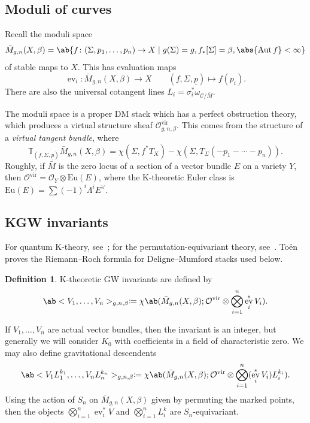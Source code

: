 \documentclass{amsart}
\theoremstyle{definition}
\newtheorem{defn}[thm]{Definition}
\theoremstyle{remark}
\theoremstyle{plain}
\theoremstyle{definition}
\theoremstyle{remark}
\newcommand{\mc}[1]{\mathcal{#1}}
\newcommand{\mr}[1]{\mathrm{#1}}
\newcommand{\ul}[1]{\underline{#1}}
\newcommand{\1}{\mathbf{1}}
\newcommand{\2}{\mathbf{2}}
\newcommand{\3}{\mathbf{3}}
\newcommand{\vir}{\mr{vir}}
\DeclareMathOperator{\Aut}{Aut}
\DeclareMathOperator{\ev}{ev}
\begin{document}
\subsection{Moduli of curves}%
\label{sub:Moduli of curves}

Recall the moduli space
\[ \bar{M}_{g,n}(X, \beta) = \ab\{ f \colon (\Sigma, p_1, \ldots, p_n) \to X \mid g(\Sigma) = g, f_*[\Sigma] = \beta, \abs{\Aut f} < \infty \} \]
of stable maps to \(X\). This has evaluation maps
\[ \ev_i \colon \bar{M}_{g,n}(X, \beta) \to X \qquad (f, \Sigma, \ul{p}) \mapsto f(p_i). \]
There are also the universal cotangent lines \(L_i = \sigma_i^* \omega_{ \mc{C}/\bar{M} }\).

The moduli space is a proper DM stack which has a perfect obstruction theory, which produces a virtual structure sheaf \(\mc{O}^{\vir}_{g,n,\beta}\). This comes from the structure of a \textit{virtual tangent bundle}, where
\[ \mathbb{T}_{(f, \Sigma, \ul{p})} \bar{M}_{g,n}(X, \beta) = \chi(\Sigma, f^* T_X) - \chi(\Sigma, T_{\Sigma}(-p_1 - \cdots - p_n)). \]
Roughly, if \(\bar{M}\) is the zero locus of a section of a vector bundle \(E\) on a variety \(Y\), then \(\mc{O}^{\vir} = \mc{O}_Y \otimes \mr{Eu}(E)\), where the K-theoretic Euler class is \(\mr{Eu}(E) = \sum (-1)^i \Lambda^i E^{\vee}\).

\subsection{KGW invariants}%
\label{sub:KGW invariants}

For quantum K-theory, see~\cite{Lee2004}; for the permutation-equivariant theory, see~\cite{Givental2017K1,GiventalK7}. To\"en~\cite{Toen1999} proves the Riemann--Roch formula for Deligne--Mumford stacks used below.

\begin{defn}
    K-theoretic GW invariants are defined by
    \[ \ab<V_1, \ldots, V_n>_{g,n,\beta} \coloneqq \chi\ab(\bar{M}_{g,n}(X, \beta); \mc{O}^{\vir} \otimes \bigotimes_{i=1}^n \ev_i^* V_i). \]
\end{defn}

If \(V_1, \ldots, V_n\) are actual vector bundles, then the invariant is an integer, but generally we will consider \(K_0\) with coefficients in a field of characteristic zero. We may also define gravitational descendents
\[ \ab<V_1 L_1^{k_1}, \ldots, V_n L_n^{k_n}>_{g,n,\beta} \coloneqq \chi\ab(\bar{M}_{g,n}(X, \beta); \mc{O}^{\vir} \otimes \bigotimes_{i=1}^n ( \ev_i^* V_i )L_i^{k_i} ). \]
Using the action of \(S_n\) on \(\bar{M}_{g,n}(X, \beta)\) given by permuting the marked points, then the objects \(\bigotimes_{i=1}^n \ev_i^* V\) and \(\bigotimes_{i=1}^n L_i^k\) are \(S_n\)-equivariant.
\end{document}
